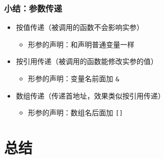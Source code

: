 \begin{frame}[fragile]
    \frametitle{小结：参数传递}

    \begin{itemize}
        \item<1-> 按值传递（被调用的函数不会影响实参）
        
        \begin{itemize}
            \item 形参的声明：和声明普通变量一样
        \end{itemize}

        \item<2-> 按引用传递（被调用的函数能修改实参的值）
        
        \begin{itemize}
            \item 形参的声明：变量名前面加 \lstinline|&|
        \end{itemize}

        \item<3-> 数组传递（传递首地址，效果类似按引用传递）
        
        \begin{itemize}
            \item 形参的声明：数组名后面加 \lstinline|[]|
        \end{itemize}

    \end{itemize}

\end{frame}


\section{总结}


